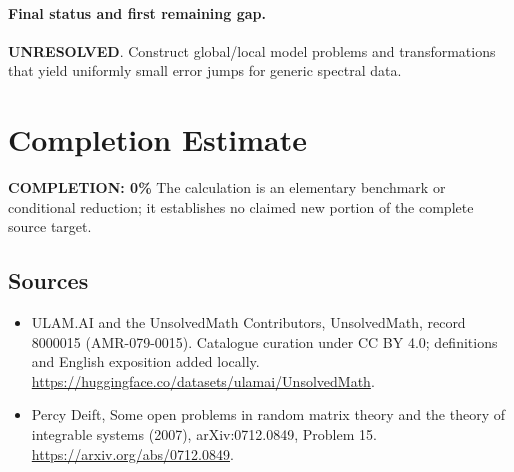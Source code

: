 \documentclass[11pt]{article}
\begin{document}
\paragraph{Final status and first remaining gap.}
\textbf{UNRESOLVED}. Construct global/local model problems and transformations that yield uniformly small error jumps for generic spectral data.

\section{Completion Estimate}
\noindent\textbf{COMPLETION: 0\%}
The calculation is an elementary benchmark or conditional reduction; it establishes no claimed new portion of the complete source target.

\subsection{Sources}
\begin{itemize}
\item[\hypertarget{source:8000015:1}{S1}] ULAM.AI and the UnsolvedMath Contributors, UnsolvedMath, record 8000015 (AMR-079-0015). Catalogue curation under CC BY 4.0; definitions and English exposition added locally.
\url{https://huggingface.co/datasets/ulamai/UnsolvedMath}.
\item[\hypertarget{source:8000015:2}{S2}] Percy Deift, Some open problems in random matrix theory and the theory of integrable systems (2007), arXiv:0712.0849, Problem 15.
\url{https://arxiv.org/abs/0712.0849}.
\end{itemize}
\label{end:8000015}
\end{document}
